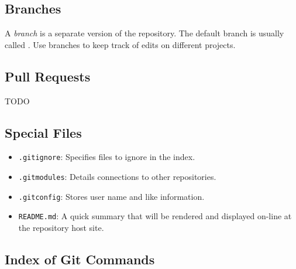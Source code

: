 \subsection*{Branches} %

A \emph{branch} is a separate version of the repository.
The default branch is usually called .
Use branches to keep track of edits on different projects.

\subsection*{Pull Requests} %

TODO

\subsection*{Special Files} %

\begin{itemize}
\item \texttt{.gitignore}: Specifies files to ignore in the index.
\item \texttt{.gitmodules}: Details connections to other repositories.
\item \texttt{.gitconfig}: Stores user name and like information.
\item \texttt{README.md}: A quick summary that will be rendered and displayed on-line at the repository host site.
\end{itemize}

\subsection*{Index of Git Commands} %

